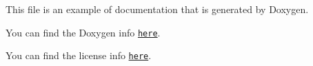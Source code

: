 This file is an example of documentation that is generated by Doxygen.

You can find the Doxygen info \href{http://www.stack.nl/~dimitri/doxygen/index.html}{\tt here}.

You can find the license info \href{https://choosealicense.com/}{\tt here}. 